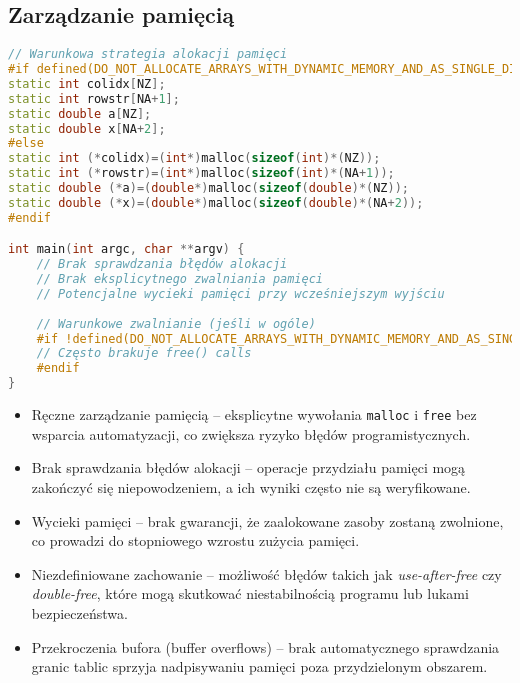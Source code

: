 \subsection{Zarządzanie pamięcią}
\begin{lstlisting}[language=C++, caption={Zarządzanie pamięcią w benchmarkach C++ z OpenMP}, label={lst:openmp_memory}]
// Warunkowa strategia alokacji pamięci
#if defined(DO_NOT_ALLOCATE_ARRAYS_WITH_DYNAMIC_MEMORY_AND_AS_SINGLE_DIMENSION)
static int colidx[NZ];
static int rowstr[NA+1];
static double a[NZ];
static double x[NA+2];
#else
static int (*colidx)=(int*)malloc(sizeof(int)*(NZ));
static int (*rowstr)=(int*)malloc(sizeof(int)*(NA+1));
static double (*a)=(double*)malloc(sizeof(double)*(NZ));
static double (*x)=(double*)malloc(sizeof(double)*(NA+2));
#endif

int main(int argc, char **argv) {
    // Brak sprawdzania błędów alokacji
    // Brak eksplicytnego zwalniania pamięci
    // Potencjalne wycieki pamięci przy wcześniejszym wyjściu
    
    // Warunkowe zwalnianie (jeśli w ogóle)
    #if !defined(DO_NOT_ALLOCATE_ARRAYS_WITH_DYNAMIC_MEMORY_AND_AS_SINGLE_DIMENSION)
    // Często brakuje free() calls
    #endif
}
\end{lstlisting}
\begin{itemize}
    \item Ręczne zarządzanie pamięcią – eksplicytne wywołania \texttt{malloc} i \texttt{free} bez wsparcia automatyzacji, co zwiększa ryzyko błędów programistycznych.
    
    \item Brak sprawdzania błędów alokacji – operacje przydziału pamięci mogą zakończyć się niepowodzeniem, a ich wyniki często nie są weryfikowane.
    
    \item Wycieki pamięci – brak gwarancji, że zaalokowane zasoby zostaną zwolnione, co prowadzi do stopniowego wzrostu zużycia pamięci.
    
    \item Niezdefiniowane zachowanie – możliwość błędów takich jak \textit{use-after-free} czy \textit{double-free}, które mogą skutkować niestabilnością programu lub lukami bezpieczeństwa.
    
    \item Przekroczenia bufora (buffer overflows) – brak automatycznego sprawdzania granic tablic sprzyja nadpisywaniu pamięci poza przydzielonym obszarem.
\end{itemize}
  
